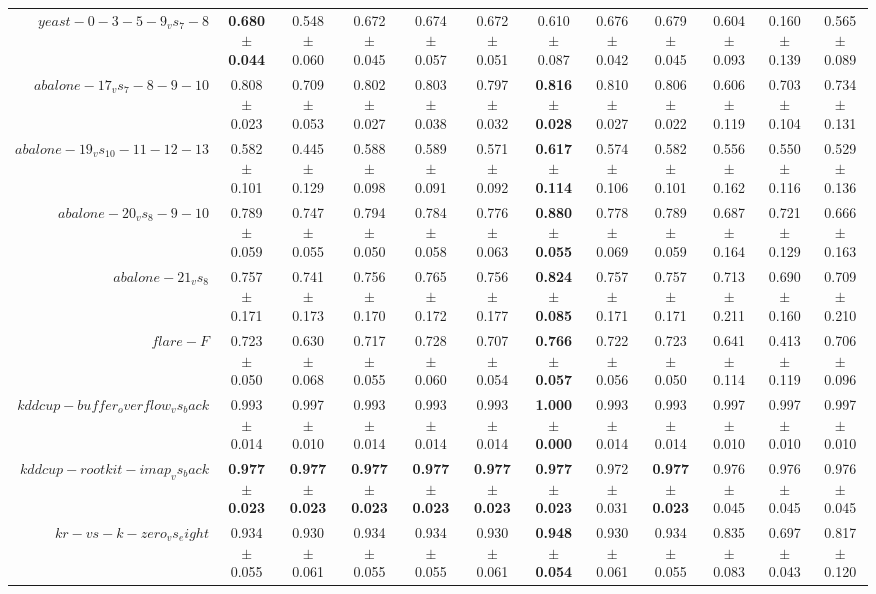\begin{table}[!ht]
{\begin{tabular}{r c c c c c c c c c c c}
$yeast-0-3-5-9_vs_7-8$ & \textbf{0.680 $\pm$ 0.044} & 0.548 $\pm$ 0.060 & 0.672 $\pm$ 0.045 & 0.674 $\pm$ 0.057 & 0.672 $\pm$ 0.051 & 0.610 $\pm$ 0.087 & 0.676 $\pm$ 0.042 & 0.679 $\pm$ 0.045 & 0.604 $\pm$ 0.093 & 0.160 $\pm$ 0.139 & 0.565 $\pm$ 0.089 \\
$abalone-17_vs_7-8-9-10$ & 0.808 $\pm$ 0.023 & 0.709 $\pm$ 0.053 & 0.802 $\pm$ 0.027 & 0.803 $\pm$ 0.038 & 0.797 $\pm$ 0.032 & \textbf{0.816 $\pm$ 0.028} & 0.810 $\pm$ 0.027 & 0.806 $\pm$ 0.022 & 0.606 $\pm$ 0.119 & 0.703 $\pm$ 0.104 & 0.734 $\pm$ 0.131 \\
$abalone-19_vs_10-11-12-13$ & 0.582 $\pm$ 0.101 & 0.445 $\pm$ 0.129 & 0.588 $\pm$ 0.098 & 0.589 $\pm$ 0.091 & 0.571 $\pm$ 0.092 & \textbf{0.617 $\pm$ 0.114} & 0.574 $\pm$ 0.106 & 0.582 $\pm$ 0.101 & 0.556 $\pm$ 0.162 & 0.550 $\pm$ 0.116 & 0.529 $\pm$ 0.136 \\
$abalone-20_vs_8-9-10$ & 0.789 $\pm$ 0.059 & 0.747 $\pm$ 0.055 & 0.794 $\pm$ 0.050 & 0.784 $\pm$ 0.058 & 0.776 $\pm$ 0.063 & \textbf{0.880 $\pm$ 0.055} & 0.778 $\pm$ 0.069 & 0.789 $\pm$ 0.059 & 0.687 $\pm$ 0.164 & 0.721 $\pm$ 0.129 & 0.666 $\pm$ 0.163 \\
$abalone-21_vs_8$ & 0.757 $\pm$ 0.171 & 0.741 $\pm$ 0.173 & 0.756 $\pm$ 0.170 & 0.765 $\pm$ 0.172 & 0.756 $\pm$ 0.177 & \textbf{0.824 $\pm$ 0.085} & 0.757 $\pm$ 0.171 & 0.757 $\pm$ 0.171 & 0.713 $\pm$ 0.211 & 0.690 $\pm$ 0.160 & 0.709 $\pm$ 0.210 \\
$flare-F$ & 0.723 $\pm$ 0.050 & 0.630 $\pm$ 0.068 & 0.717 $\pm$ 0.055 & 0.728 $\pm$ 0.060 & 0.707 $\pm$ 0.054 & \textbf{0.766 $\pm$ 0.057} & 0.722 $\pm$ 0.056 & 0.723 $\pm$ 0.050 & 0.641 $\pm$ 0.114 & 0.413 $\pm$ 0.119 & 0.706 $\pm$ 0.096 \\
$kddcup-buffer_overflow_vs_back$ & 0.993 $\pm$ 0.014 & 0.997 $\pm$ 0.010 & 0.993 $\pm$ 0.014 & 0.993 $\pm$ 0.014 & 0.993 $\pm$ 0.014 & \textbf{1.000 $\pm$ 0.000} & 0.993 $\pm$ 0.014 & 0.993 $\pm$ 0.014 & 0.997 $\pm$ 0.010 & 0.997 $\pm$ 0.010 & 0.997 $\pm$ 0.010 \\
$kddcup-rootkit-imap_vs_back$ & \textbf{0.977 $\pm$ 0.023} & \textbf{0.977 $\pm$ 0.023} & \textbf{0.977 $\pm$ 0.023} & \textbf{0.977 $\pm$ 0.023} & \textbf{0.977 $\pm$ 0.023} & \textbf{0.977 $\pm$ 0.023} & 0.972 $\pm$ 0.031 & \textbf{0.977 $\pm$ 0.023} & 0.976 $\pm$ 0.045 & 0.976 $\pm$ 0.045 & 0.976 $\pm$ 0.045 \\
$kr-vs-k-zero_vs_eight$ & 0.934 $\pm$ 0.055 & 0.930 $\pm$ 0.061 & 0.934 $\pm$ 0.055 & 0.934 $\pm$ 0.055 & 0.930 $\pm$ 0.061 & \textbf{0.948 $\pm$ 0.054} & 0.930 $\pm$ 0.061 & 0.934 $\pm$ 0.055 & 0.835 $\pm$ 0.083 & 0.697 $\pm$ 0.043 & 0.817 $\pm$ 0.120 \\

\end{tabular}}
\end{table}
